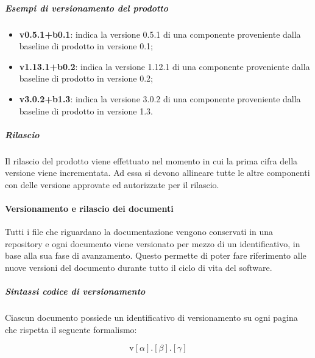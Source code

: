 		\subparagraph{Esempi di versionamento del prodotto}

		\begin{itemize}
			\item \textbf{v0.5.1+b0.1}: indica la versione 0.5.1 di una componente proveniente dalla baseline di prodotto in versione 0.1;
			\item \textbf{v1.13.1+b0.2}:  indica la versione 1.12.1 di una componente proveniente dalla baseline di prodotto in versione 0.2;
			\item \textbf{v3.0.2+b1.3}: indica la versione 3.0.2 di una componente proveniente dalla baseline di prodotto in versione 1.3.
		\end{itemize}

		\subparagraph{Rilascio}

		Il rilascio del prodotto viene effettuato nel momento in cui la prima cifra della versione viene incrementata. Ad essa si devono allineare tutte le altre componenti con delle versione approvate ed autorizzate per il rilascio. 

	\paragraph{Versionamento e rilascio dei documenti}

	Tutti i file che riguardano la documentazione vengono conservati in una repository e ogni documento viene versionato per mezzo di un identificativo, in base alla sua fase di avanzamento. Questo permette di poter fare riferimento alle nuove versioni del documento durante tutto il ciclo di vita del software.

		\subparagraph{Sintassi codice di versionamento}

		Ciascun documento possiede un identificativo di versionamento su ogni pagina che rispetta il seguente formalismo:

		\[%
			\text{v}[\alpha].[\beta].[\gamma]
		\]

